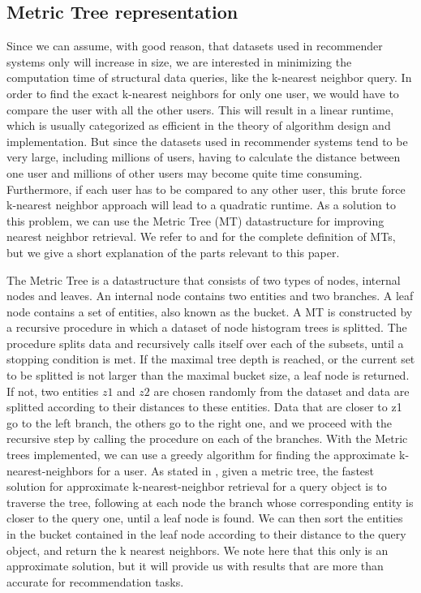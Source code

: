 \subsection{Metric Tree representation}
  Since we can assume, with good reason, that datasets used in recommender systems only will increase in size, we are interested in minimizing the computation time of structural data queries, like the k-nearest neighbor query. In order to find the exact k-nearest neighbors for only one user, we would have to compare the user with all the other users. This will result in a linear runtime, which is usually categorized as efficient in the theory of algorithm design and implementation. But since the datasets used in recommender systems tend to be very large, including millions of users, having to calculate the distance between one user and millions of other users may become quite time consuming. Furthermore, if each user has to be compared to any other user, this brute force k-nearest neighbor approach will lead to a quadratic runtime. As a solution to this problem, we can use the Metric Tree (MT) datastructure for improving nearest neighbor retrieval. We refer to \cite{jaeger2019counts} and \cite{uhlmann1991} for the complete definition of MTs, but we give a short explanation of the parts relevant to this paper.

  The Metric Tree is a datastructure that consists of two types of nodes, internal nodes and leaves. An internal node contains two entities and two branches. A leaf node contains a set of entities, also known as the bucket. A MT is constructed by a recursive procedure in which a dataset of node histogram trees is splitted. The procedure splits data and recursively calls itself over each of the subsets, until a stopping condition is met. If the maximal tree depth is reached, or the current set to be splitted is not larger than the maximal bucket size, a leaf node is returned. If not, two entities $z1$ and $z2$ are chosen randomly from the dataset and data are splitted according to their distances to these entities. Data that are closer to z1 go to the left branch, the others go to the right one, and we proceed with the recursive step by calling the procedure on each of the branches.
  With the Metric trees implemented, we can use a greedy algorithm for finding the approximate k-nearest-neighbors for a user.
  As stated in \cite{jaeger2019counts}, given a metric tree, the fastest solution for approximate k-nearest-neighbor retrieval for a query object is to traverse the tree, following at each node the branch whose corresponding entity is closer to the query one, until a leaf node is found. We can then sort the entities in the bucket contained in the leaf node according to their distance to the query object, and return the k nearest neighbors. We note here that this only is an approximate solution, but it will provide us with results that are more than accurate for recommendation tasks. 
